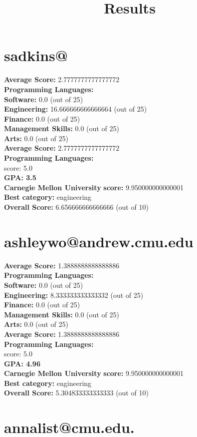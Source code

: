 \documentclass{article}
\title{Results}
\begin{document}
\section{sadkins@}
\textbf{Average Score: } 2.7777777777777772\\
\textbf{Programming Languages:} \\
\textbf{Software:} 0.0 (out of 25)\\
    \textbf{Engineering: } 16.666666666666664 (out of 25)\\
    \textbf{Finance:} 0.0 (out of 25)\\
    \textbf{Management Skills:} 0.0 (out of 25)\\
    \textbf{Arts:} 0.0 (out of 25)\\
\textbf{Average Score: } 2.7777777777777772\\
\textbf{Programming Languages:} \\
score: 5.0\\
\textbf{GPA: 3.5}\\
\textbf{Carnegie Mellon University} \textbf{score:} 9.950000000000001\\
\textbf{Best category: } engineering\\
    \textbf{Overall Score: }6.656666666666666 (out of 10)\section{ashleywo@andrew.cmu.edu}
\textbf{Average Score: } 1.3888888888888886\\
\textbf{Programming Languages:} \\
\textbf{Software:} 0.0 (out of 25)\\
    \textbf{Engineering: } 8.333333333333332 (out of 25)\\
    \textbf{Finance:} 0.0 (out of 25)\\
    \textbf{Management Skills:} 0.0 (out of 25)\\
    \textbf{Arts:} 0.0 (out of 25)\\
\textbf{Average Score: } 1.3888888888888886\\
\textbf{Programming Languages:} \\
score: 5.0\\
\textbf{GPA: 4.96}\\
\textbf{Carnegie Mellon University} \textbf{score:} 9.950000000000001\\
\textbf{Best category: } engineering\\
    \textbf{Overall Score: }5.304833333333333 (out of 10)\section{annalist@cmu.edu.}
\end{document}
